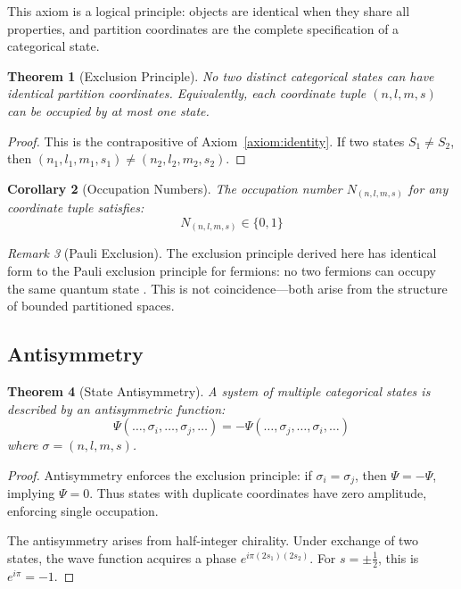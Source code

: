 \documentclass[twocolumn,10pt,a4paper]{article}
\newtheorem{theorem}{Theorem}[section]
\newtheorem{corollary}[theorem]{Corollary}
\theoremstyle{definition}
\theoremstyle{remark}
\newtheorem{remark}[theorem]{Remark}
\begin{document}
This axiom is a logical principle: objects are identical when they share all properties, and partition coordinates are the complete specification of a categorical state.

\begin{theorem}[Exclusion Principle]
\label{thm:exclusion}
No two distinct categorical states can have identical partition coordinates. Equivalently, each coordinate tuple $(n, l, m, s)$ can be occupied by at most one state.
\end{theorem}

\begin{proof}
This is the contrapositive of Axiom~\ref{axiom:identity}. If two states $S_1 \neq S_2$, then $(n_1, l_1, m_1, s_1) \neq (n_2, l_2, m_2, s_2)$.
\end{proof}

\begin{corollary}[Occupation Numbers]
The occupation number $N_{(n,l,m,s)}$ for any coordinate tuple satisfies:
\begin{equation}
    N_{(n,l,m,s)} \in \{0, 1\}
\end{equation}
\end{corollary}

\begin{remark}[Pauli Exclusion]
The exclusion principle derived here has identical form to the Pauli exclusion principle for fermions: no two fermions can occupy the same quantum state \cite{pauli1925}. This is not coincidence---both arise from the structure of bounded partitioned spaces.
\end{remark}

\subsection{Antisymmetry}

\begin{theorem}[State Antisymmetry]
\label{thm:antisymmetry}
A system of multiple categorical states is described by an antisymmetric function:
\begin{equation}
    \Psi(\ldots, \sigma_i, \ldots, \sigma_j, \ldots) = -\Psi(\ldots, \sigma_j, \ldots, \sigma_i, \ldots)
\end{equation}
where $\sigma = (n, l, m, s)$.
\end{theorem}

\begin{proof}
Antisymmetry enforces the exclusion principle: if $\sigma_i = \sigma_j$, then $\Psi = -\Psi$, implying $\Psi = 0$. Thus states with duplicate coordinates have zero amplitude, enforcing single occupation.

The antisymmetry arises from half-integer chirality. Under exchange of two states, the wave function acquires a phase $e^{i\pi(2s_1)(2s_2)}$. For $s = \pm\frac{1}{2}$, this is $e^{i\pi} = -1$.
\end{proof}
\end{document}
